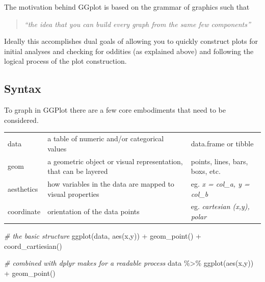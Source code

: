 \documentclass[
]{book}
\newenvironment{Shaded}{\begin{snugshade}}{\end{snugshade}}
\newcommand{\CommentTok}[1]{\textcolor[rgb]{0.56,0.35,0.01}{\textit{#1}}}
\newcommand{\FunctionTok}[1]{\textcolor[rgb]{0.00,0.00,0.00}{#1}}
\newcommand{\NormalTok}[1]{#1}
\newcommand{\SpecialCharTok}[1]{\textcolor[rgb]{0.00,0.00,0.00}{#1}}
\begin{document}
The motivation behind GGplot is based on the grammar of graphics such that

\begin{quote}
\emph{``the idea that you can build every graph from the same few components''}
\end{quote}

Ideally this accomplishes dual goals of allowing you to quickly construct plots for initial analyses and checking for oddities (as explained above) and following the logical process of the plot construction.

\hypertarget{syntax-1}{%
\subsection{Syntax}\label{syntax-1}}

To graph in GGPlot there are a few core embodiments that need to be considered.

\begin{longtable}[]{@{}
  >{\raggedright\arraybackslash}p{}
  >{\raggedright\arraybackslash}p{}
  >{\raggedright\arraybackslash}p{}@{}}
\toprule\noalign{}
\endhead
\bottomrule\noalign{}
\endlastfoot
data & a table of numeric and/or categorical values & data.frame or tibble \\
geom & a geometric object or visual representation, that can be layered & points, lines, bars, boxs, etc. \\
aesthetics & how variables in the data are mapped to visual properties & eg. \emph{x = col\_a, y = col\_b} \\
coordinate & orientation of the data points & eg. \emph{cartesian (x,y), polar} \\
\end{longtable}

\begin{Shaded}
\begin{Highlighting}[]
\CommentTok{\# the basic structure}
\FunctionTok{ggplot}\NormalTok{(data, }\FunctionTok{aes}\NormalTok{(x,y)) }\SpecialCharTok{+} \FunctionTok{geom\_point}\NormalTok{() }\SpecialCharTok{+} \FunctionTok{coord\_cartiesian}\NormalTok{()}

\CommentTok{\# combined with dplyr makes for a readable process}
\NormalTok{data }\SpecialCharTok{\%\textgreater{}\%} \FunctionTok{ggplot}\NormalTok{(}\FunctionTok{aes}\NormalTok{(x,y)) }\SpecialCharTok{+} \FunctionTok{geom\_point}\NormalTok{()}
\end{Highlighting}
\end{Shaded}
\end{document}
